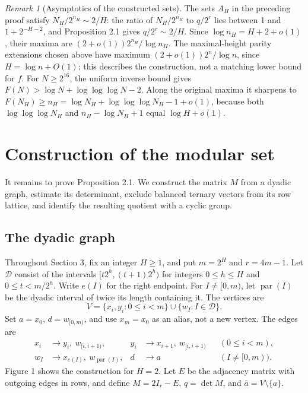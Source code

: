 \documentclass[reqno]{amsart}
\theoremstyle{remark}
\newtheorem{remark}[theorem]{Remark}
\numberwithin{equation}{section}
\begin{document}
\begin{remark}[Asymptotics of the constructed sets]
The sets $A_H$ in the preceding proof satisfy $N_H/2^{n_H}\sim 2/H$: the ratio of
$N_H/2^{n_H}$ to $q/2^r$ lies between 1 and $1+2^{-H-2}$, and Proposition 2.1 gives
$q/2^r\sim 2/H$.  Since $\log n_H=H+2+o(1)$, their maxima are
$(2+o(1))2^{n_H}/\log n_H$.  The maximal-height parity extensions chosen above have maximum
$(2+o(1))2^n/\log n$, since $H=\log n+O(1)$; this describes the construction, not a matching
lower bound for $f$.  For $N\geq 2^{16}$, the uniform inverse bound gives
$F(N)>\log N+\log\log\log N-2$.  Along the original maxima it sharpens to
$F(N_H)\geq n_H=\log N_H+\log\log\log N_H-1+o(1)$, because both
$\log\log\log N_H$ and $n_H-\log N_H+1$ equal $\log H+o(1)$.
\end{remark}

\section{Construction of the modular set}

It remains to prove Proposition 2.1.  We construct the matrix $M$ from a dyadic graph, estimate
its determinant, exclude balanced ternary vectors from its row lattice, and identify the resulting
quotient with a cyclic group.

\subsection{The dyadic graph}

Throughout Section 3, fix an integer $H\geq 1$, and put $m=2^H$ and $r=4m-1$.  Let $\mathcal D$
consist of the intervals $[t2^h,(t+1)2^h)$ for integers $0\leq h\leq H$ and
$0\leq t<m/2^h$.  Write $e(I)$ for the right endpoint.  For $I\neq[0,m)$, let
$\operatorname{par}(I)$ be the dyadic interval of twice its length containing it.  The vertices
are
\[
V=\{x_i,y_i:0\leq i<m\}\cup\{w_I:I\in\mathcal D\}.
\]
Set $a=x_0$, $d=w_{[0,m)}$, and use $x_m=x_0$ as an alias, not a new vertex.  The edges are
\begin{equation}
\begin{aligned}
x_i&\longrightarrow y_i,\ w_{[i,i+1)},
&y_i&\longrightarrow x_{i+1},\ w_{[i,i+1)} &&(0\leq i<m),\\
w_I&\longrightarrow x_{e(I)},\ w_{\operatorname{par}(I)},
&d&\longrightarrow a &&(I\neq[0,m)).
\end{aligned}
\tag{3.1}
\end{equation}
Figure 1 shows the construction for $H=2$.  Let $E$ be the adjacency matrix with outgoing edges
in rows, and define $M=2I_r-E$, $q=\det M$, and $\bar a=V\setminus\{a\}$.
\end{document}
